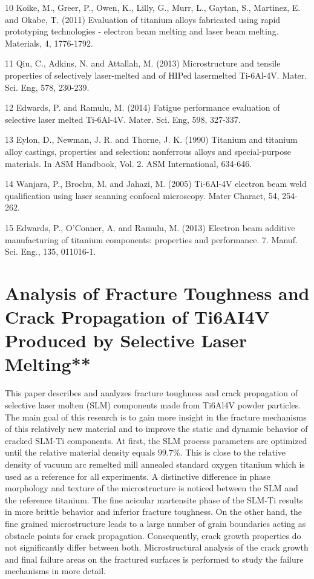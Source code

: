 \documentclass[10pt]{article}
\begin{document}
10 Koike, M., Greer, P., Owen, K., Lilly, G., Murr, L., Gaytan, S., Martinez, E. and Okabe, T. (2011) Evaluation of titanium alloys fabricated using rapid prototyping technologies - electron beam melting and laser beam melting. Materials, 4, 1776-1792.

11 Qiu, C., Adkins, N. and Attallah, M. (2013) Microstructure and tensile properties of selectively laser-melted and of HIPed lasermelted Ti-6Al-4V. Mater. Sci. Eng, 578, 230-239.

12 Edwards, P. and Ramulu, M. (2014) Fatigue performance evaluation of selective laser melted Ti-6Al-4V. Mater. Sci. Eng, 598, 327-337.

13 Eylon, D., Newman, J. R. and Thorne, J. K. (1990) Titanium and titanium alloy castings, properties and selection: nonferrous alloys and special-purpose materials. In ASM Handbook, Vol. 2. ASM International, 634-646.

14 Wanjara, P., Brochu, M. and Jahazi, M. (2005) Ti-6Al-4V electron beam weld qualification using laser scanning confocal microscopy. Mater Charact, 54, 254-262.

15 Edwards, P., O'Conner, A. and Ramulu, M. (2013) Electron beam additive manufacturing of titanium components: properties and performance. 7. Manuf. Sci. Eng., 135, 011016-1.

\section*{Analysis of Fracture Toughness and Crack Propagation of Ti6AI4V Produced by Selective Laser Melting** }
This paper describes and analyzes fracture toughness and crack propagation of selective laser molten (SLM) components made from Ti6Al4V powder particles. The main goal of this research is to gain more insight in the fracture mechanisms of this relatively new material and to improve the static and dynamic behavior of cracked SLM-Ti components. At first, the SLM process parameters are optimized until the relative material density equals $99.7 \%$. This is close to the relative density of vacuum arc remelted mill annealed standard oxygen titanium which is used as a reference for all experiments. A distinctive difference in phase morphology and texture of the microstructure is noticed between the SLM and the reference titanium. The fine acicular martensite phase of the SLM-Ti results in more brittle behavior and inferior fracture toughness. On the other hand, the fine grained microstructure leads to a large number of grain boundaries acting as obstacle points for crack propagation. Consequently, crack growth properties do not significantly differ between both. Microstructural analysis of the crack growth and final failure areas on the fractured surfaces is performed to study the failure mechanisms in more detail.
\end{document}
